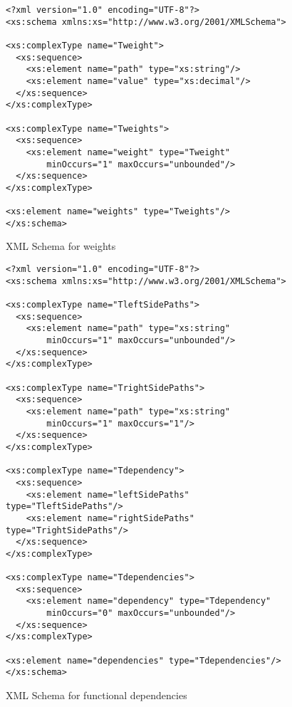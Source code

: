 
\begin{figure}[h]
\caption{XML Schema for weights}
\label{weightschema}
\begin{verbatim}
<?xml version="1.0" encoding="UTF-8"?>
<xs:schema xmlns:xs="http://www.w3.org/2001/XMLSchema">

<xs:complexType name="Tweight">
  <xs:sequence>
    <xs:element name="path" type="xs:string"/>
    <xs:element name="value" type="xs:decimal"/>
  </xs:sequence>
</xs:complexType>

<xs:complexType name="Tweights">
  <xs:sequence>
    <xs:element name="weight" type="Tweight"
        minOccurs="1" maxOccurs="unbounded"/>
  </xs:sequence>
</xs:complexType>

<xs:element name="weights" type="Tweights"/>
</xs:schema>
\end{verbatim}
\end{figure}

\begin{figure}[h]
\caption{XML Schema for functional dependencies}
\label{fdschema}

\begin{verbatim}
<?xml version="1.0" encoding="UTF-8"?>
<xs:schema xmlns:xs="http://www.w3.org/2001/XMLSchema">

<xs:complexType name="TleftSidePaths">
  <xs:sequence>
    <xs:element name="path" type="xs:string"
        minOccurs="1" maxOccurs="unbounded"/>
  </xs:sequence>
</xs:complexType>

<xs:complexType name="TrightSidePaths">
  <xs:sequence>
    <xs:element name="path" type="xs:string"
        minOccurs="1" maxOccurs="1"/>
  </xs:sequence>
</xs:complexType>

<xs:complexType name="Tdependency">
  <xs:sequence>
    <xs:element name="leftSidePaths" type="TleftSidePaths"/>
    <xs:element name="rightSidePaths" type="TrightSidePaths"/>
  </xs:sequence>
</xs:complexType>

<xs:complexType name="Tdependencies">
  <xs:sequence>
    <xs:element name="dependency" type="Tdependency"
        minOccurs="0" maxOccurs="unbounded"/>
  </xs:sequence>
</xs:complexType>

<xs:element name="dependencies" type="Tdependencies"/>
</xs:schema>
\end{verbatim}
\end{figure}
